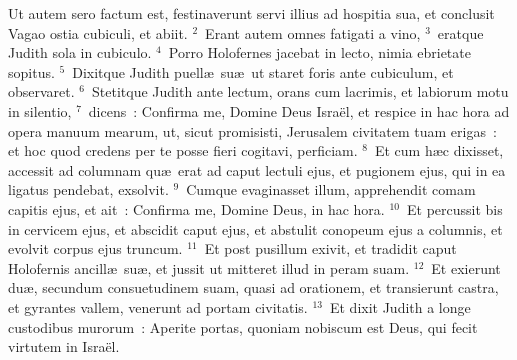 \bchapter
\lettrine[lines=3,image=true,loversize=0.05,lraise=-0.03]{U}{}t autem sero factum est, festinaverunt servi illius ad hospitia sua, et conclusit Vagao ostia cubiculi, et abiit.
${}^{2}$~Erant autem omnes fatigati a vino,
${}^{3}$~eratque Judith sola in cubiculo.
${}^{4}$~Porro Holofernes jacebat in lecto, nimia ebrietate sopitus.
${}^{5}$~Dixitque Judith puell\ae\ su\ae\ ut staret foris ante cubiculum, et observaret.
${}^{6}$~Stetitque Judith ante lectum, orans cum lacrimis, et labiorum motu in silentio,
${}^{7}$~dicens~: Confirma me, Domine Deus Isra\"el, et respice in hac hora ad opera manuum mearum, ut, sicut promisisti, Jerusalem civitatem tuam erigas~: et hoc quod credens per te posse fieri cogitavi, perficiam.
${}^{8}$~Et cum h\ae c dixisset, accessit ad columnam qu\ae\ erat ad caput lectuli ejus, et pugionem ejus, qui in ea ligatus pendebat, exsolvit.
${}^{9}$~Cumque evaginasset illum, apprehendit comam capitis ejus, et ait~: Confirma me, Domine Deus, in hac hora.
${}^{10}$~Et percussit bis in cervicem ejus, et abscidit caput ejus, et abstulit conopeum ejus a columnis, et evolvit corpus ejus truncum.
${}^{11}$~Et post pusillum exivit, et tradidit caput Holofernis ancill\ae\ su\ae , et jussit ut mitteret illud in peram suam.
${}^{12}$~Et exierunt du\ae , secundum consuetudinem suam, quasi ad orationem, et transierunt castra, et gyrantes vallem, venerunt ad portam civitatis.
${}^{13}$~Et dixit Judith a longe custodibus murorum~: Aperite portas, quoniam nobiscum est Deus, qui fecit virtutem in Isra\"el.


